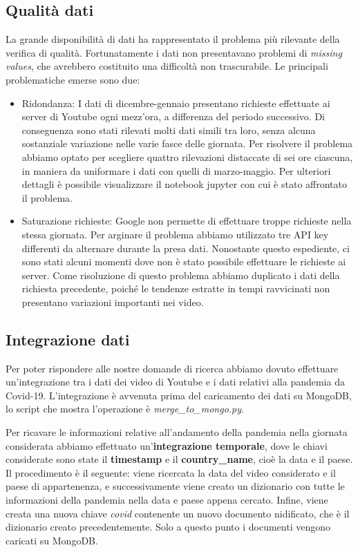 \documentclass[10pt, a4paper,openany]{article}
\begin{document}
\subsection*{Qualità dati}
La grande disponibilità di dati ha rappresentato il problema più rilevante della verifica di qualità. Fortunatamente i dati non presentavano problemi di \textit{missing values}, che avrebbero costituito una difficoltà non trascurabile. Le principali problematiche emerse sono due:
\begin{itemize}
	
	\item Ridondanza: I dati di dicembre-gennaio presentano richieste effettuate ai server di Youtube ogni mezz'ora, a differenza del periodo successivo. Di conseguenza sono stati rilevati molti dati simili tra loro, senza alcuna sostanziale variazione nelle varie fasce delle giornata. Per risolvere il problema abbiamo optato per scegliere quattro rilevazioni distaccate di sei ore ciascuna, in maniera da uniformare i dati con quelli di marzo-maggio. Per ulteriori dettagli è possibile visualizzare il notebook jupyter con cui è stato affrontato il problema.

	\item Saturazione richieste: Google non permette di effettuare troppe richieste nella stessa giornata. Per arginare il problema abbiamo utilizzato tre API key differenti da alternare durante la presa dati. Nonostante questo espediente, ci sono stati alcuni momenti dove non è stato possibile effettuare le richieste ai server. Come risoluzione di questo problema abbiamo duplicato i dati della richiesta precedente, poiché le tendenze estratte in tempi ravvicinati non presentano variazioni importanti nei video.
	
	
\end{itemize}

\subsection*{Integrazione dati}
	Per poter rispondere alle nostre domande di ricerca abbiamo dovuto effettuare un'integrazione tra i dati dei video di Youtube e i dati relativi alla pandemia da Covid-19. L'integrazione è avvenuta prima del caricamento dei dati su MongoDB, lo script che mostra l'operazione è \textit{merge\_to\_mongo.py}. 
	
	Per ricavare le informazioni relative all'andamento della pandemia nella giornata considerata abbiamo effettuato un'\textbf{integrazione temporale}, dove le chiavi considerate sono state il \textbf{timestamp} e il \textbf{country\_name}, cioè la data e il paese. Il procedimento è il seguente: viene ricercata la data del video considerato e il paese di appartenenza, e successivamente viene creato un dizionario con tutte le informazioni della pandemia nella data e paese appena cercato. Infine, viene creata una nuova chiave \textit{covid} contenente un nuovo documento nidificato, che è il dizionario creato precedentemente. Solo a questo punto i documenti vengono caricati su MongoDB.
	
\end{document}
